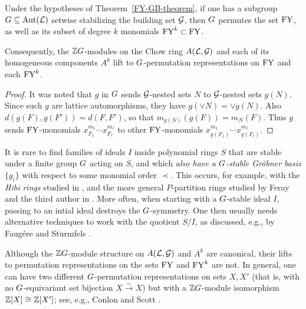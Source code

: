 \begin{cor}
\label{Chow-ring-carries-perm-reps-cor}
Under the hypotheses of Theorem~\ref{FY-GB-theorem},
if one has a subgroup $G \subseteq
\operatorname{\mathrm{Aut}}(\mathcal{L})$ setwise stabilizing the
building set $\mathcal{G}$, then
$G$ permutes the set $\mathrm{FY}$,
as well as its subset of degree $k$ monomials $\mathrm{FY}^k \subset \mathrm{FY}$.  

Consequently, the $\mathbb{Z} G$-modules on the Chow ring $A(\mathcal{L}, \mathcal{G})$ and each of its homogeneous components $A^k$ lift to $G$-permutation representations on $\mathrm{FY}$ and each $\mathrm{FY}^k$.  
\end{cor}
\begin{proof}
It was noted that $g$ in $G$ sends $\mathcal{G}$-nested sets $N$ to
$\mathcal{G}$-nested sets $g(N)$.  Since such $g$ are lattice automorphisms, they have $g(\vee N)=\vee g(N)$.  Also $d(g(F),g(F'))=d(F,F')$, so that
$m_{g(N)}(g(F))=m_N(F)$.
Thus $g$ sends $\mathrm{FY}$-monomials
$x_{F_1}^{m_1} \cdots x_{F_\ell}^{m_\ell}$
to other $\mathrm{FY}$-monomials
$x_{g(F_1)}^{m_1} \cdots x_{g(F_\ell)}^{m_\ell}$.
\end{proof}



\begin{remark} \rm
It is rare to find families of ideals $I$ inside polynomial rings $S$ that are stable under a finite group $G$ acting on $S$, and which
{\it also have a $G$-stable Gr\"obner basis} $\{g_i\}$ 
with respect to some monomial order $\prec$.  This occurs, for example, with the {\it Hibi rings} studied in \cite{Hibi}, and the more general $P$-partition rings studied by Feray and the third author in \cite[Thm. 6.3]{FerayR}.  More often, when starting with a $G$-stable ideal $I$, passing to an intial ideal destroys the $G$-symmetry. One then
usually needs alternative techniques to work with the quotient $S/I$, as discussed, e.g., by Faug\'ere \cite{Faugere} and Sturmfels \cite[\S 2.6]{Sturmfels}.
\end{remark}

\begin{remark} \rm
Although the $\mathbb{Z} G$-module structure on $A(\mathcal{L}, \mathcal{G})$ and $A^k$ are canonical, their lifts to permutation representations on the
sets $\mathrm{FY}$ and $\mathrm{FY}^k$ are not.  In general, one can have two different $G$-permutation representations on sets $X, X'$ (that is, with no $G$-equivariant set bijection $X \overset{\sim}{\longrightarrow} X$) but 
with a $\mathbb{Z} G$-module isomorphism $\mathbb{Z} [X] \cong \mathbb{Z} [X']$; 
see, e.g., Conlon \cite{Conlon}
and Scott \cite{Scott}. 

\end{remark}

